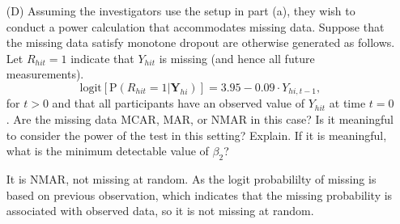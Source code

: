 \begin{itemize}
								\vspace{0.2cm} 
								\item[(D)] Assuming the investigators use the setup in part (a), they wish to conduct a power calculation that accommodates missing data. Suppose that the missing data satisfy 
													 monotone dropout are otherwise generated as follows. Let $R_{hit}=1$ indicate that $Y_{hit}$ is missing (and hence all future measurements).
														\[
																 \text{logit}\left[\text{P}\left( R_{hit} = 1 \big|  \mathbf{Y}_{hi}\right)\right] = 3.95 - 0.09 \cdot Y_{hi,t-1},
														\]
													 for $t>0$ and that all participants have an observed value of $Y_{hit}$ at time $t=0$. Are the missing data MCAR, MAR, or NMAR in this case? Is it meaningful 
													 to consider the power of the test in this setting? Explain. If it is meaningful, what is the minimum detectable value of $\beta_2$?

It is NMAR, not missing at random. As the logit probabililty of missing is based on previous observation, which indicates that the missing probability is associated with observed data, so it is not missing at random.




													 \end{itemize}
							

